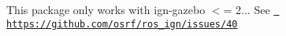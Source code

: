 This package only works with ign-\/gazebo $<$= 2... See \href{https://github.com/osrf/ros_ign/issues/40}{\texttt{ https\+://github.\+com/osrf/ros\+\_\+ign/issues/40}} 